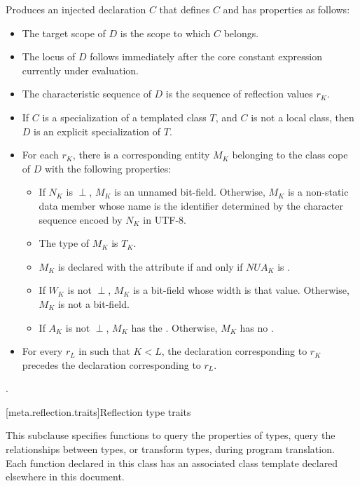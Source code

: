 \begin{itemdescr}
\pnum
\effects
Produces an injected declaration $C$
that defines $C$ and has properties as follows:
\begin{itemize}
\item
  The target scope of $D$
  is the scope to which $C$ belongs.
\item
  The locus of $D$
  follows immediately after the core constant expression
  currently under evaluation.
\item
  The characteristic sequence of $D$
  is the sequence of reflection values $r_K$.
\item
  If $C$ is a specialization of a templated class $T$,
  and $C$ is not a local class,
  then $D$ is an explicit specialization of $T$.
\item
  For each $r_K$,
  there is a corresponding entity $M_K$
  belonging to the class cope of $D$
  with the following properties:
  \begin{itemize}
  \item
    If $N_K$ is $\perp$,
    $M_K$ is an unnamed bit-field.
    Otherwise, $M_K$ is a non-static data member whose name is the identifier
    determined by the character sequence encoed by $N_K$ in UTF-8.
  \item
    The type of $M_K$ is $T_K$.
  \item
    $M_K$ is declared with the attribute 
    if and only if $\mathit{NUA}_K$ is .
  \item
    If $W_K$ is not $\perp$,
    $M_K$ is a bit-field whose width is that value.
    Otherwise, $M_K$ is not a bit-field.
  \item
    If $A_K$ is not $\perp$,
    $M_K$ has the  .
    Otherwise, $M_K$ has no .
  \end{itemize}
  \item
    For every $r_L$ in  such that $K < L$,
    the declaration corresponding to $r_K$
    precedes the declaration corresponding to $r_L$.
\end{itemize}

\pnum
\returns
{}.
\end{itemdescr}

[meta.reflection.traits]{Reflection type traits}

\pnum
This subclause specifies  functions to
query the properties of types,
query the relationships between types, or
transform types,
during program translation.
Each  function declared in this class
has an associated class template declared elsewhere in this document.

